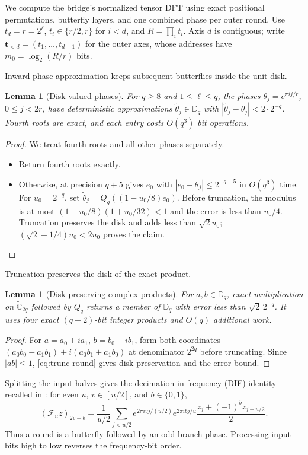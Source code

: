 \documentclass[11pt]{article}
\newtheorem{lemma}[theorem]{Lemma}
\theoremstyle{definition}
\renewcommand{\label}[1]{}%
\newcommand{\Cg}{\widetilde{\mathbb{C}}}
\newcommand{\Disk}{\mathbb{D}}
\newcommand{\cF}{\mathcal{F}}
\begin{document}
We compute the bridge's normalized tensor DFT using exact positional permutations, butterfly layers, and one combined phase per outer round.
Use $t_d=r=2^\ell$, $t_i\in\{r/2,r\}$ for $i<d$, and $R=\prod_i t_i$.
Axis $d$ is contiguous; write $\mathbf t_{<d}=(t_1,\ldots,t_{d-1})$ for the outer axes, whose addresses have $m_0=\log_2(R/r)$ bits.

Inward phase approximation keeps subsequent butterflies inside the unit disk.

\begin{lemma}[Disk-valued phases]\label{lem:phases}
For $q\ge8$ and $1\le\ell\le q$, the phases $\theta_j=e^{\pi i j/r}$,
$0\le j<2r$, have deterministic approximations $\tilde\theta_j\in\Disk_q$
with $|\tilde\theta_j-\theta_j|<2\cdot2^{-q}$.
Fourth roots are exact, and each entry costs $O(q^3)$ bit operations.
\end{lemma}
\begin{proof}
We treat fourth roots and all other phases separately.
\begin{itemize}[leftmargin=*,nosep]
\item Return fourth roots exactly.
\item Otherwise,  at precision $q+5$ gives $e_0$ with
$|e_0-\theta_j|\le2^{-q-5}$ in $O(q^3)$ time.
For $u_0=2^{-q}$, set $\tilde\theta_j=Q_q((1-u_0/8)e_0)$.
Before truncation, the modulus is at most
$(1-u_0/8)(1+u_0/32)<1$ and the error is less than $u_0/4$.
Truncation preserves the disk and adds less than $\sqrt2u_0$;
$(\sqrt2+1/4)u_0<2u_0$ proves the claim.
\end{itemize}
\end{proof}

Truncation preserves the disk of the exact product.

\begin{lemma}[Disk-preserving complex products]\label{lem:disk-prod}
For $a,b\in\Disk_q$, exact multiplication on $\Cg_{2q}$ followed by $Q_q$
returns a member of $\Disk_q$ with error less than $\sqrt2\,2^{-q}$.
It uses four exact $(q+2)$-bit integer products and $O(q)$ additional work.
\end{lemma}
\begin{proof}
For $a=a_0+ia_1$, $b=b_0+ib_1$, form both coordinates
$(a_0b_0-a_1b_1)+i(a_0b_1+a_1b_0)$ at denominator $2^{2q}$ before truncating.
Since $|ab|\le1$, \eqref{eq:trunc-round} gives disk preservation and the error bound.
\end{proof}

Splitting the input halves gives the decimation-in-frequency (DIF) identity recalled in :
for even $u$, $v\in[u/2]$, and $b\in\{0,1\}$,
\begin{equation}\label{eq:dif-step}
 (\cF_u z)_{2v+b}
 =\frac1{u/2}\sum_{j<u/2}
 e^{2\pi i vj/(u/2)}e^{2\pi i bj/u}
 \frac{z_j+(-1)^bz_{j+u/2}}2 .
\end{equation}
Thus a round is a butterfly followed by an odd-branch phase.
Processing input bits high to low reverses the frequency-bit order.
\end{document}
